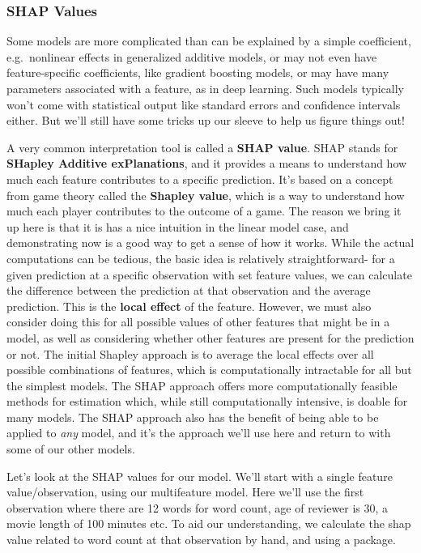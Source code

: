 \documentclass[
  letterpaper,
]{krantz}
\begin{document}
\subsubsection{SHAP Values}\label{shap-values}

Some models are more complicated than can be explained by a simple
coefficient, e.g.~nonlinear effects in generalized additive models, or
may not even have feature-specific coefficients, like gradient boosting
models, or may have many parameters associated with a feature, as in
deep learning. Such models typically won't come with statistical output
like standard errors and confidence intervals either. But we'll still
have some tricks up our sleeve to help us figure things out!

A very common interpretation tool is called a \textbf{SHAP value}. SHAP
stands for \textbf{SHapley Additive exPlanations}, and it provides a
means to understand how much each feature contributes to a specific
prediction. It's based on a concept from game theory called the
\textbf{Shapley value}, which is a way to understand how much each
player contributes to the outcome of a game. The reason we bring it up
here is that it is has a nice intuition in the linear model case, and
demonstrating now is a good way to get a sense of how it works. While
the actual computations can be tedious, the basic idea is relatively
straightforward- for a given prediction at a specific observation with
set feature values, we can calculate the difference between the
prediction at that observation and the average prediction. This is the
\textbf{local effect} of the feature. However, we must also consider
doing this for all possible values of other features that might be in a
model, as well as considering whether other features are present for the
prediction or not. The initial Shapley approach is to average the local
effects over all possible combinations of features, which is
computationally intractable for all but the simplest models. The SHAP
approach offers more computationally feasible methods for estimation
which, while still computationally intensive, is doable for many models.
The SHAP approach also has the benefit of being able to be applied to
\emph{any} model, and it's the approach we'll use here and return to
with some of our other models.

Let's look at the SHAP values for our model. We'll start with a single
feature value/observation, using our multifeature model. Here we'll use
the first observation where there are 12 words for word count, age of
reviewer is 30, a movie length of 100 minutes etc. To aid our
understanding, we calculate the shap value related to word count at that
observation by hand, and using a package.
\end{document}
